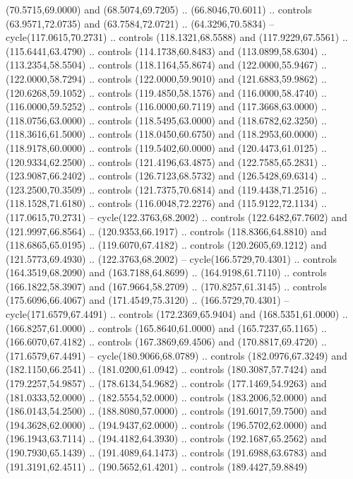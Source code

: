   (70.5715,69.0000) and (68.5074,69.7205) .. (66.8046,70.6011) .. controls
  (63.9571,72.0735) and (63.7584,72.0721) .. (64.3296,70.5834) --
  cycle(117.0615,70.2731) .. controls (118.1321,68.5588) and (117.9229,67.5561)
  .. (115.6441,63.4790) .. controls (114.1738,60.8483) and (113.0899,58.6304) ..
  (113.2354,58.5504) .. controls (118.1164,55.8674) and (122.0000,55.9467) ..
  (122.0000,58.7294) .. controls (122.0000,59.9010) and (121.6883,59.9862) ..
  (120.6268,59.1052) .. controls (119.4850,58.1576) and (116.0000,58.4740) ..
  (116.0000,59.5252) .. controls (116.0000,60.7119) and (117.3668,63.0000) ..
  (118.0756,63.0000) .. controls (118.5495,63.0000) and (118.6782,62.3250) ..
  (118.3616,61.5000) .. controls (118.0450,60.6750) and (118.2953,60.0000) ..
  (118.9178,60.0000) .. controls (119.5402,60.0000) and (120.4473,61.0125) ..
  (120.9334,62.2500) .. controls (121.4196,63.4875) and (122.7585,65.2831) ..
  (123.9087,66.2402) .. controls (126.7123,68.5732) and (126.5428,69.6314) ..
  (123.2500,70.3509) .. controls (121.7375,70.6814) and (119.4438,71.2516) ..
  (118.1528,71.6180) .. controls (116.0048,72.2276) and (115.9122,72.1134) ..
  (117.0615,70.2731) -- cycle(122.3763,68.2002) .. controls (122.6482,67.7602)
  and (121.9997,66.8564) .. (120.9353,66.1917) .. controls (118.8366,64.8810)
  and (118.6865,65.0195) .. (119.6070,67.4182) .. controls (120.2605,69.1212)
  and (121.5773,69.4930) .. (122.3763,68.2002) -- cycle(166.5729,70.4301) ..
  controls (164.3519,68.2090) and (163.7188,64.8699) .. (164.9198,61.7110) ..
  controls (166.1822,58.3907) and (167.9664,58.2709) .. (170.8257,61.3145) ..
  controls (175.6096,66.4067) and (171.4549,75.3120) .. (166.5729,70.4301) --
  cycle(171.6579,67.4491) .. controls (172.2369,65.9404) and (168.5351,61.0000)
  .. (166.8257,61.0000) .. controls (165.8640,61.0000) and (165.7237,65.1165) ..
  (166.6070,67.4182) .. controls (167.3869,69.4506) and (170.8817,69.4720) ..
  (171.6579,67.4491) -- cycle(180.9066,68.0789) .. controls (182.0976,67.3249)
  and (182.1150,66.2541) .. (181.0200,61.0942) .. controls (180.3087,57.7424)
  and (179.2257,54.9857) .. (178.6134,54.9682) .. controls (177.1469,54.9263)
  and (181.0333,52.0000) .. (182.5554,52.0000) .. controls (183.2006,52.0000)
  and (186.0143,54.2500) .. (188.8080,57.0000) .. controls (191.6017,59.7500)
  and (194.3628,62.0000) .. (194.9437,62.0000) .. controls (196.5702,62.0000)
  and (196.1943,63.7114) .. (194.4182,64.3930) .. controls (192.1687,65.2562)
  and (190.7930,65.1439) .. (191.4089,64.1473) .. controls (191.6988,63.6783)
  and (191.3191,62.4511) .. (190.5652,61.4201) .. controls (189.4427,59.8849)
